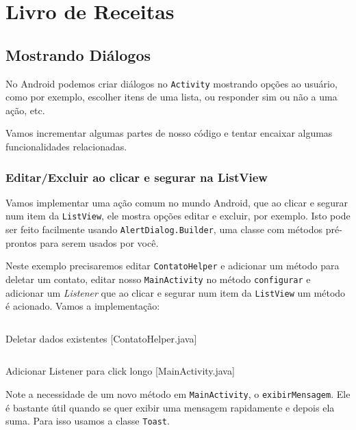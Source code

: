 \chapter{Livro de Receitas}

\section{Mostrando Diálogos}

No Android podemos criar diálogos no \texttt{Activity} mostrando opções ao usuário, como por exemplo,
escolher itens de uma lista, ou responder sim ou não a uma ação, etc.

Vamos incrementar algumas partes de nosso código e tentar encaixar algumas funcionalidades
relacionadas.

\subsection{Editar/Excluir ao clicar e segurar na ListView}

Vamos implementar uma ação comum no mundo Android, que ao clicar e segurar num item
da \texttt{ListView}, ele mostra opções editar e excluir, por exemplo. Isto pode ser
feito facilmente usando \texttt{AlertDialog.Builder}, uma classe com métodos pré-prontos
para serem usados por você.

Neste exemplo precisaremos editar \texttt{ContatoHelper} e adicionar um método para
deletar um contato, editar nosso \texttt{MainActivity} no método \texttt{configurar}
e adicionar um \textit{Listener} que ao clicar e segurar num item da \texttt{ListView}
um método é acionado. Vamos a implementação:

\begin{listing}[H]
  \inputminted[linenos=true,frame=bottomline,tabsize=3]{ java }{ source/ContatoHelper-5.java }
  \caption{Deletar dados existentes [ContatoHelper.java]}
\end{listing}

\begin{listing}[H]
  \inputminted[linenos=true,frame=bottomline,tabsize=3]{ java }{ source/MainActivity-8.java }
  \caption{Adicionar Listener para click longo [MainActivity.java]}
\end{listing}

Note a necessidade de um novo método em \texttt{MainActivity}, o \texttt{exibirMensagem}.
Ele é bastante útil quando se quer exibir uma mensagem rapidamente e depois ela suma.
Para isso usamos a classe \texttt{Toast}.

